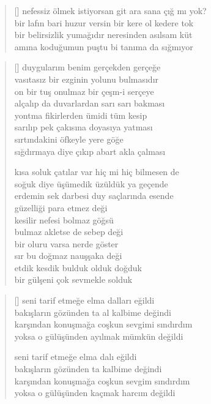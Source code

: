 \documentclass[a5paper, openright, twoside]{memoir}
\begin{document}
\begin{verse}[\versewidth]
  nefessiz ölmek istiyorsan git ara sana çığ mı yok? \\
  bir lafın bari huzur versin bir kere ol kedere tok \\
  bir belirsizlik yumağıdır neresinden asılsam küt \\
  amına koduğumun puştu bi tanıma da sığmıyor \\
\end{verse}
\begin{verse}[\versewidth]
  duygularım benim gerçekden gerçeğe \\
  vasıtasız bir ezginin yolunu bulmasıdır \\
  on bir tuş onulmaz bir çeşm-i serçeye \\
  alçalıp da duvarlardan sarı sarı bakması \\
  yontma fikirlerden ümidi tüm kesip \\
  sarılıp pek çakısına doyasıya yatması \\
  sırtındakini öfkeyle yere göğe \\
  sığdırmaya diye çıkıp abart akla çalması

  kısa soluk çatılar var hiç mi hiç bilmesen de \\
  soğuk diye üşümedik üzüldük ya geçende \\
  erdemin sek darbesi duy saçlarında esende \\
  güzelliği para etmez deği \\
  kesilir nefesi bolmaz göğsü \\
  bulmaz akletse de sebep deği \\
  bir oluru varsa nerde göster \\
  sır bu doğmaz nauşşaka deği \\
  etdik kesdik bulduk olduk doğduk \\
  bir gülşeni çok sevmekle solduk \\
\end{verse}
\begin{verse}[\versewidth]
  seni tarif etmeğe elma dalları eğildi \\
  bakışların gözünden ta al kalbime değindi \\
  karşından konuşmağa coşkun sevgimi sındırdım \\
  yoksa o gülüşünden ayılmak mümkün değildi

  seni tarif etmeğe elma dalı eğildi \\
  bakışların gözünden ta kalbime değindi \\
  karşından konuşmağa coşkun sevgim sındırdım \\
  yoksa o gülüşünden kaçmak harcım değildi \\
\end{verse}
\end{document}
